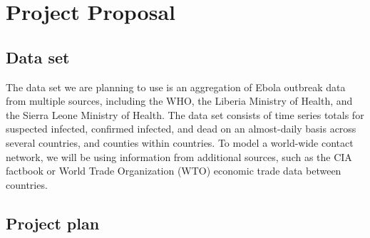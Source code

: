 \documentclass[10pt, journal,onecolumn]{IEEEtran}
\begin{document}

\section{Project Proposal}
\label{sec:ProjectProposal}
\bigskip

\subsection{Data set}

The data set we are planning to use \citep{cmriversdata} is an aggregation of Ebola outbreak data
from multiple sources, including the WHO, the Liberia Ministry of Health, and the Sierra Leone
Ministry of Health. The data set consists of time series totals for suspected infected, confirmed
infected, and dead on an almost-daily basis across several countries, and counties within countries.
To model a world-wide contact network, we will be using information from additional sources, such
as the CIA factbook or World Trade Organization (WTO) economic trade data between countries.



\subsection{Project plan}

\bigskip
\end{document}
